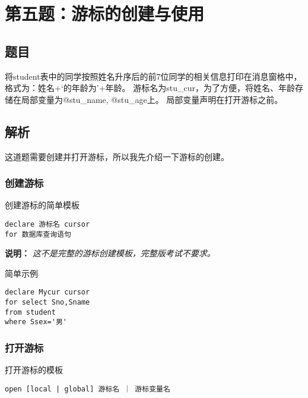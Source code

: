 \section{第五题：游标的创建与使用}

\subsection{题目}

\qquad 将student表中的同学按照姓名升序后的前7位同学的相关信息打印在消息窗格中，格式为：姓名+‘的年龄为’+年龄。
游标名为stu\_cur，为了方便，将姓名、年龄存储在局部变量为@stu\_name, @stu\_age上。 局部变量声明在打开游标之前。

\subsection{解析}

\qquad 这道题需要创建并打开游标，所以我先介绍一下游标的创建。

\subsubsection{创建游标}

\qquad 创建游标的简单模板

\begin{mdframed}[backgroundcolor=gray!10]
\begin{verbatim}
declare 游标名 cursor
for 数据库查询语句
\end{verbatim}
\end{mdframed}

\qquad \textbf{说明：} \emph{这不是完整的游标创建模板，完整版考试不要求。}

\qquad 简单示例

\begin{mdframed}[backgroundcolor=gray!10]
\begin{verbatim}
declare Mycur cursor
for select Sno,Sname
from student
where Ssex='男'
\end{verbatim}
\end{mdframed}

\subsubsection{打开游标}

\qquad 打开游标的模板

\begin{mdframed}[backgroundcolor=gray!10]
\begin{verbatim}
open [local | global] 游标名 ｜ 游标变量名
\end{verbatim}
\end{mdframed}

